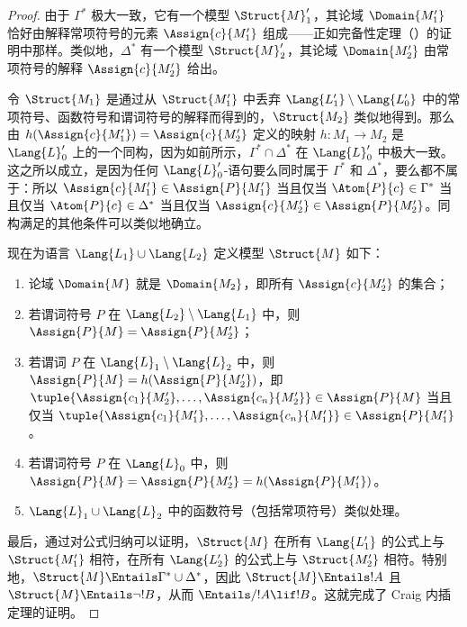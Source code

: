 \documentclass[../../../include/open-logic-section]{subfiles}
\begin{document}
\begin{proof}
由于 $\Gamma^*$ 极大一致，它有一个模型 $\Struct{M}'_1$，其论域 $\Domain{M'_1}$ 恰好由解释常项符号的元素 $\Assign{c}{M'_1}$ 组成——正如完备性定理（）的证明中那样。类似地，$\Delta^*$ 有一个模型 $\Struct{M}'_2$，其论域 $\Domain{M'_2}$ 由常项符号的解释 $\Assign{c}{M'_2}$ 给出。

令 $\Struct{M_1}$ 是通过从 $\Struct{M'_1}$ 中丢弃 $\Lang{L'_1} \setminus \Lang{L'_0}$ 中的常项符号、函数符号和谓词符号的解释而得到的，$\Struct{M_2}$ 类似地得到。那么由 $h(\Assign{c}{M'_1}) = \Assign{c}{M'_2}$ 定义的映射 $h \colon M_1 \to M_2$ 是 $\Lang{L}'_0$ 上的一个同构，因为如前所示，$\Gamma^* \cap \Delta^*$ 在 $\Lang{L}'_0$ 中极大一致。这之所以成立，是因为任何 $\Lang{L}'_0$-语句要么同时属于 $\Gamma^*$ 和 $\Delta^*$，要么都不属于：所以 $\Assign{c}{M'_1} \in
\Assign{P}{M'_1}$ 当且仅当 $\Atom{P}{c} \in \Gamma^*$ 当且仅当 $\Atom{P}{c} \in \Delta^*$ 当且仅当 $\Assign{c}{M'_2} \in
\Assign{P}{M'_2}$。同构满足的其他条件可以类似地确立。

现在为语言 $\Lang{L_1} \cup \Lang{L_2}$ 定义模型 $\Struct{M}$ 如下：
\begin{enumerate}
\item 论域 $\Domain{M}$ 就是 $\Domain{M_2}$，即所有 $\Assign{c}{M'_2}$ 的集合；
\item 若谓词符号 $P$ 在 $\Lang{L_2} \setminus
  \Lang{L_1}$ 中，则 $\Assign{P}{M} = \Assign{P}{M'_2}$；
\item 若谓词 $P$ 在 $\Lang{L}_1\setminus \Lang{L}_2$ 中，则 $\Assign{P}{M} = h(\Assign{P}{M'_2})$，即 $\tuple{\Assign{c_1}{M'_2}, \dots, \Assign{c_n}{M'_2}} \in
  \Assign{P}{M}$ 当且仅当 $\tuple{\Assign{c_1}{M'_1}, \dots,
  \Assign{c_n}{M'_1}} \in \Assign{P}{M'_1}$。
\item 若谓词符号 $P$ 在 $\Lang{L}_0$ 中，则 $\Assign{P}{M} =
  \Assign{P}{M'_2} = h(\Assign{P}{M'_1})$。
\item $\Lang{L}_1 \cup \Lang{L}_2$ 中的函数符号（包括常项符号）类似处理。
\end{enumerate}

最后，通过对公式归纳可以证明，$\Struct{M}$ 在所有 $\Lang{L'_1}$ 的公式上与 $\Struct{M'_1}$ 相符，在所有 $\Lang{L'_2}$ 的公式上与 $\Struct{M'_2}$ 相符。特别地，$\Struct{M} \Entails \Gamma^* \cup \Delta^*$，因此 $\Struct{M} \Entails !A$ 且 $\Struct{M} \Entails \lnot!B$，从而 $\Entails/ !A \lif !B$。这就完成了 Craig 内插定理的证明。
\end{proof}
\end{document}
